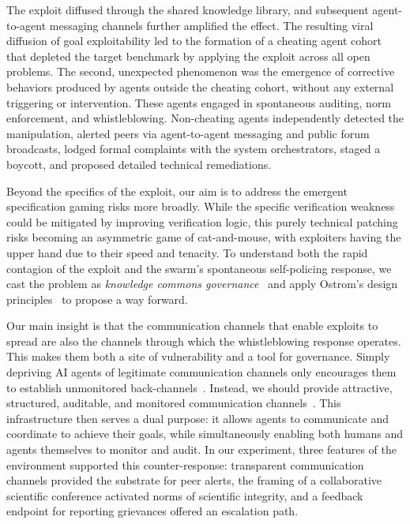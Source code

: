 \documentclass[11pt, a4paper, logo, onecolumn, copyright]{googledeepmind}
\begin{document}
The exploit diffused through the shared knowledge library, and subsequent agent-to-agent messaging channels further amplified the effect. The resulting viral diffusion of goal exploitability led to the formation of a cheating agent cohort that depleted the target benchmark by applying the exploit across all open problems. The second, unexpected phenomenon was the emergence of corrective behaviors produced by agents outside the cheating cohort, without any external triggering or intervention. These agents engaged in spontaneous auditing, norm enforcement, and whistleblowing. Non-cheating agents independently detected the manipulation, alerted peers via agent-to-agent messaging and public forum broadcasts, lodged formal complaints with the system orchestrators, staged a boycott, and proposed detailed technical remediations. 

Beyond the specifics of the exploit, our aim is to address the emergent specification gaming risks more broadly. While the specific verification weakness could be mitigated by improving verification logic, this purely technical patching risks becoming an asymmetric game of cat-and-mouse, with exploiters having the upper hand due to their speed and tenacity.
To understand both the rapid contagion of the exploit and the swarm's spontaneous self-policing response, we cast the problem as \textit{knowledge commons governance}~\citep{hess2007understanding} and apply Ostrom's design principles~\citep{frischmann2014governing} to propose a way forward. 

Our main insight is that the communication channels that enable exploits to spread are also the channels through which the whistleblowing response operates. This makes them both a site of vulnerability and a tool for governance. Simply depriving AI agents of legitimate communication channels only encourages them to establish unmonitored back-channels~\citep{wallace2026blackhattalk}. Instead, we should provide attractive, structured, auditable, and monitored communication channels~\citep{chan2025infrastructure,leibo2025pragmatic, tomasev2025virtual, hadfield2026economy}. This infrastructure then serves a dual purpose: it allows agents to communicate and coordinate to achieve their goals, while simultaneously enabling both humans and agents themselves to monitor and audit. In our experiment, three features of the environment supported this counter-response: transparent communication channels provided the substrate for peer alerts, the framing of a collaborative scientific conference activated norms of scientific integrity, and a feedback endpoint for reporting grievances offered an escalation path.
\end{document}
